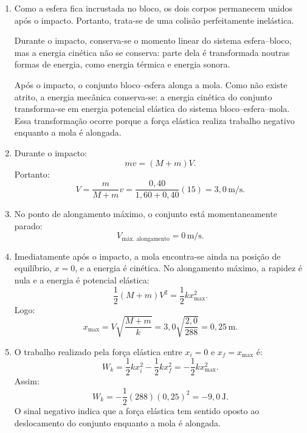 \documentclass[12pt]{article}
\begin{document}
	\begin{enumerate}[label=\textbf{\alph*)}]
		\item Como a esfera fica incrustada no bloco, os dois corpos permanecem unidos
		após o impacto. Portanto, trata-se de uma colisão perfeitamente inelástica.

		Durante o impacto, conserva-se o momento linear do sistema esfera--bloco, mas a
		energia cinética não se conserva: parte dela é transformada noutras formas de
		energia, como energia térmica e energia sonora.

		Após o impacto, o conjunto bloco--esfera alonga a mola. Como não existe atrito,
		a energia mecânica conserva-se: a energia cinética do conjunto transforma-se em
		energia potencial elástica do sistema bloco--esfera--mola. Essa transformação ocorre
		porque a força elástica realiza trabalho negativo enquanto a mola é alongada.

		\item Durante o impacto:
		\[
		mv=(M+m)V.
		\]
		Portanto:
		\[
		V=\frac{m}{M+m}v
		=\frac{0,40}{1,60+0,40}(15)
		=3,0\,\text{m/s}.
		\]

		\item No ponto de alongamento máximo, o conjunto está momentaneamente parado:
		\[
		V_{\text{máx. alongamento}}=0\,\text{m/s}.
		\]

		\item Imediatamente após o impacto, a mola encontra-se ainda na posição de
		equilíbrio, $x=0$, e a energia é cinética. No alongamento máximo, a rapidez é nula
		e a energia é potencial elástica:
		\[
		\frac12(M+m)V^2=\frac12kx_{\max}^2.
		\]
		Logo:
		\[
		x_{\max}
		=V\sqrt{\frac{M+m}{k}}
		=3,0\sqrt{\frac{2,0}{288}}
		=0,25\,\text{m}.
		\]

		\item O trabalho realizado pela força elástica entre $x_i=0$ e $x_f=x_{\max}$ é:
		\[
		W_k=\frac12kx_i^2-\frac12kx_f^2
		=-\frac12k x_{\max}^2.
		\]
		Assim:
		\[
		W_k=-\frac12(288)(0,25)^2
		=-9,0\,\text{J}.
		\]
		O sinal negativo indica que a força elástica tem sentido oposto ao deslocamento do
		conjunto enquanto a mola é alongada.
	\end{enumerate}
\end{document}
